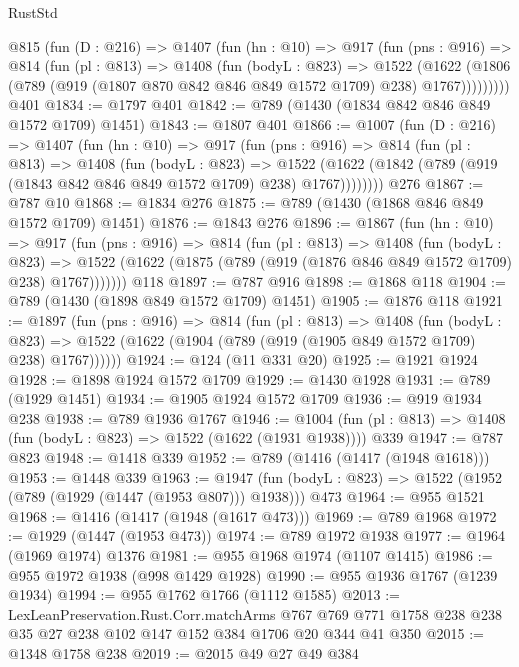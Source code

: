 \begin{lexlean}{RustStd}
\begin{coremodule}
{\begin{coremodule}
{{{{{{{    @815
      (fun (D : @216) =>
      @1407
        (fun (hn : @10) =>
        @917
          (fun (pns : @916) =>
          @814
            (fun (pl : @813) =>
            @1408
              (fun (bodyL : @823) =>
              @1522
                (@1622
                  (@1806 (@789 (@919 (@1807 @870 @842 @846 @849 @1572 @1709) @238) @1767)))))))))
    @401
@1834 := @1797 @401
@1842 := @789 (@1430 (@1834 @842 @846 @849 @1572 @1709) @1451)
@1843 := @1807 @401
@1866 := @1007
    (fun (D : @216) =>
    @1407
      (fun (hn : @10) =>
      @917
        (fun (pns : @916) =>
        @814
          (fun (pl : @813) =>
          @1408
            (fun (bodyL : @823) =>
            @1522 (@1622 (@1842 (@789 (@919 (@1843 @842 @846 @849 @1572 @1709) @238) @1767))))))))
    @276
@1867 := @787 @10
@1868 := @1834 @276
@1875 := @789 (@1430 (@1868 @846 @849 @1572 @1709) @1451)
@1876 := @1843 @276
@1896 := @1867
    (fun (hn : @10) =>
    @917
      (fun (pns : @916) =>
      @814
        (fun (pl : @813) =>
        @1408
          (fun (bodyL : @823) =>
          @1522 (@1622 (@1875 (@789 (@919 (@1876 @846 @849 @1572 @1709) @238) @1767)))))))
    @118
@1897 := @787 @916
@1898 := @1868 @118
@1904 := @789 (@1430 (@1898 @849 @1572 @1709) @1451)
@1905 := @1876 @118
@1921 := @1897
    (fun (pns : @916) =>
    @814
      (fun (pl : @813) =>
      @1408
        (fun (bodyL : @823) =>
        @1522 (@1622 (@1904 (@789 (@919 (@1905 @849 @1572 @1709) @238) @1767))))))
@1924 := @124 (@11 @331 @20)
@1925 := @1921 @1924
@1928 := @1898 @1924 @1572 @1709
@1929 := @1430 @1928
@1931 := @789 (@1929 @1451)
@1934 := @1905 @1924 @1572 @1709
@1936 := @919 @1934 @238
@1938 := @789 @1936 @1767
@1946 := @1004 (fun (pl : @813) => @1408 (fun (bodyL : @823) => @1522 (@1622 (@1931 @1938)))) @339
@1947 := @787 @823
@1948 := @1418 @339
@1952 := @789 (@1416 (@1417 (@1948 @1618)))
@1953 := @1448 @339
@1963 := @1947 (fun (bodyL : @823) => @1522 (@1952 (@789 (@1929 (@1447 (@1953 @807))) @1938))) @473
@1964 := @955 @1521
@1968 := @1416 (@1417 (@1948 (@1617 @473)))
@1969 := @789 @1968
@1972 := @1929 (@1447 (@1953 @473))
@1974 := @789 @1972 @1938
@1977 := @1964 (@1969 @1974) @1376
@1981 := @955 @1968 @1974 (@1107 @1415)
@1986 := @955 @1972 @1938 (@998 @1429 @1928)
@1990 := @955 @1936 @1767 (@1239 @1934)
@1994 := @955 @1762 @1766 (@1112 @1585)
@2013 := LexLeanPreservation.Rust.Corr.matchArms
    @767
    @769
    @771
    @1758
    @238
    @238
    @35
    @27
    @238
    @102
    @147
    @152
    @384
    @1706
    @20
    @344
    @41
    @350
@2015 := @1348 @1758 @238
@2019 := @2015 @49 @27 @49 @384
}}}}}}}
\end{coremodule}}
\end{coremodule}
\end{lexlean}
